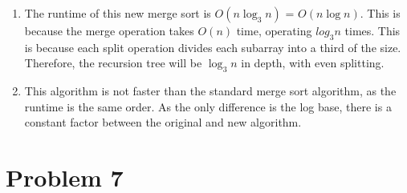 \documentclass{article}
\begin{document}
\begin{enumerate}[label=\alph*.]
\begin{algorithm}
    \end{algorithm}
    \item The runtime of this new merge sort is $O(n\log_3 n)$ = $O(n\log n)$.
        This is because the merge operation takes $O(n)$ time, operating $log_3 n$ times.
        This is because each split operation divides each subarray into a third of the size.
        Therefore, the recursion tree will be $\log_3 n$ in depth, with even splitting.
    \item This algorithm is not faster than the standard merge sort algorithm,
        as the runtime is the same order.
        As the only difference is the log base, there is a constant factor between the original and new algorithm.
\end{enumerate}

\section{Problem 7}
\end{document}
